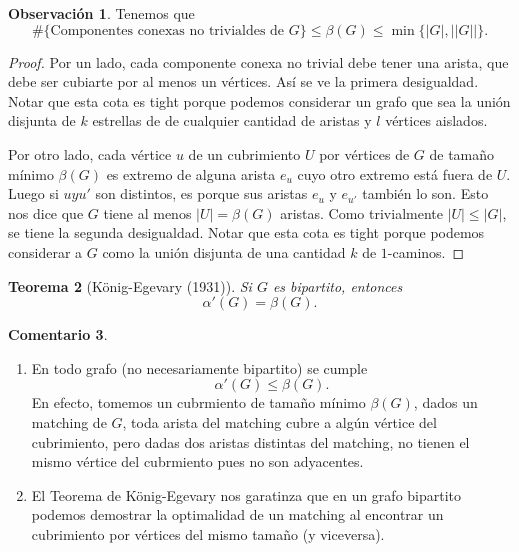 \documentclass[12pt]{report}
\theoremstyle{plain}
\newtheorem{theorem}{Teorema}[section]
\theoremstyle{definition}
\newtheorem{obs}[theorem]{Observación}
\newtheorem{remark}[theorem]{Comentario}
\newenvironment{Remark}{\colorlet{shadecolor}{Orchid!12} \begin{shaded} \begin{remark}}{ \end{remark} \end{shaded}}
\newcommand{\abs}[1]{\left \vert #1 \right \vert}
\newcommand{\Abs}[1]{\left \vert \left \vert #1 \right \vert \right \vert}
\begin{document}
\begin{obs}
Tenemos que
\[
    \#\{\text{Componentes conexas no trivialdes de $G$}\} \leq \beta (G) \leq \min \{ \abs G , \Abs G \} .
\]
\end{obs}
\begin{proof}
Por un lado, cada componente conexa no trivial debe tener una arista, que debe ser cubiarte por al menos un vértices. Así se ve la primera desigualdad. Notar que esta cota es tight porque podemos considerar un grafo que sea la unión disjunta de $k$ estrellas de de cualquier cantidad de aristas y $l$ vértices aislados.

Por otro lado, cada vértice $u$ de un cubrimiento $U$ por vértices de $G$ de tamaño mínimo $\beta (G)$ es extremo de alguna arista $e_u$ cuyo otro extremo está fuera de $U$. Luego si $u y u'$ son distintos, es porque sus aristas $e_u$ y $e_{u'}$ también lo son. Esto nos dice que $G$ tiene al menos $\abs U = \beta (G)$ aristas. Como trivialmente $\abs U \leq \abs G$, se tiene la segunda desigualdad. Notar que esta cota es tight porque podemos considerar a $G$ como la unión disjunta de una cantidad $k$ de $1$-caminos.
\end{proof}

\begin{theorem}[König-Egevary (1931)]\label{th:König-Egevary en todo grafo bipartito el tamaño maximo de un matching es igual al tamaño mínimo de un cubrimiento por vertices de las aristas}
Si $G$ es bipartito, entonces
\[
    \boxed{\alpha'(G) = \beta (G).}
\]
\end{theorem}

\begin{Remark}
\begin{enumerate}
\item En todo grafo (no necesariamente bipartito) se cumple \[ \alpha' (G) \leq \beta (G).\]
En efecto, tomemos un cubrmiento de tamaño mínimo $\beta (G)$, dados un matching de $G$, toda arista del matching cubre a algún vértice del cubrimiento, pero dadas dos aristas distintas del matching, no tienen el mismo vértice del cubrmiento pues no son adyacentes.
\item El Teorema de König-Egevary nos garatinza que en un grafo bipartito podemos demostrar la optimalidad de un matching al encontrar un cubrimiento por vértices del mismo tamaño (y viceversa).
\end{enumerate}
\end{Remark}
\end{document}
